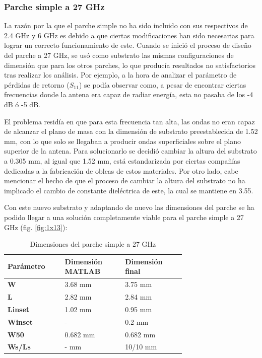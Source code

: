 \subsubsection{Parche simple a 27 GHz}
\par La razón por la que el parche simple no ha sido incluido con sus respectivos de 2.4 GHz y 6 GHz es debido a que ciertas modificaciones han sido necesarias para lograr un correcto funcionamiento de este. Cuando se inició el proceso de diseño del parche a 27 GHz, se usó como substrato las mismas configuraciones de dimensión que para los otros parches, lo que producía resultados no satisfactorios tras realizar los análisis. Por ejemplo, a la hora de analizar el parámetro de pérdidas de retorno ($S_{11}$) se podía observar como, a pesar de encontrar ciertas frecuencias donde la antena era capaz de radiar energía, esta no pasaba de los -4 dB ó -5 dB. 
\\
\par El problema residía en que para esta frecuencia tan alta, las ondas no eran capaz de alcanzar el plano de masa con la dimensión de substrato preestablecida de 1.52 mm, con lo que solo se llegaban a producir ondas superficiales sobre el plano superior de la antena. Para solucionarlo se decidió cambiar la altura del substrato a 0.305 mm, al igual que 1.52 mm, está estandarizada por ciertas compañías dedicadas a la fabricación de obleas de estos materiales. Por otro lado, cabe mencionar el hecho de que el proceso de cambiar la altura del substrato no ha implicado el cambio de constante dieléctrica de este, la cual se mantiene en 3.55.
\\
\par Con este nuevo substrato y adaptando de nuevo las dimensiones del parche se ha podido llegar a una solución completamente viable para el parche simple a 27 GHz (fig. \ref{fig:1x13}):

\begin{table}[H]
  
   \small %
   \centering %
   \begin{tabular}{m{0.2\linewidth}m{0.25\linewidth}m{0.25\linewidth}} %
   \toprule[\heavyrulewidth]\toprule[\heavyrulewidth]
   \textbf{Parámetro} & \textbf{Dimensión MATLAB} & \textbf{Dimensión final} \\ 
   \midrule
   \textbf{W} & 3.68 mm & 3.75 mm \\
   \textbf{L} & 2.82 mm & 2.84 mm\\
   \textbf{Linset} & 1.02 mm & 0.95 mm\\
   \textbf{Winset} & - & 0.2 mm\\
   \textbf{W50} & 0.682 mm & 0.682 mm\\
   \textbf{Ws/Ls} & - mm & 10/10 mm\\
   \bottomrule[\heavyrulewidth] 
   \end{tabular}
   \caption{Dimensiones del parche simple a 27 GHz} 
      \label{tab:1x13}
\end{table}
